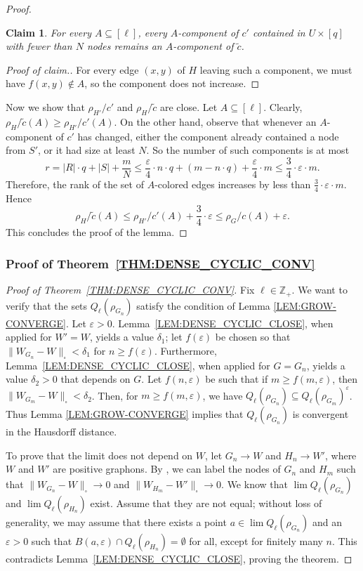 \documentclass[10pt]{article}
\theoremstyle{plain}
\newtheorem{cl}[thm]{Claim}
\theoremstyle{definition}
\newcommand{\bbZ}{\mathbb{Z}}
\newcommand{\tc}{\tilde{c}}
\newcommand{\eps}{\varepsilon}
\newcommand*{\claimproofname}{Proof of claim.}
\newenvironment{claimproof}[1][\claimproofname]{\begin{proof}[#1]\renewcommand*{\qedsymbol}{\(\bullet\)}}{\end{proof}}
\begin{document}
\begin{proof}
\begin{cl}
    For every $A\subseteq[\ell]$, every $A$-component of $c'$ contained in $U\times[q]$ with fewer than $N$ nodes remains an $A$-component of $\tc$.
\end{cl}
\begin{claimproof}
    For every edge $(x,y)$ of $H$ leaving such a component, we must have $f(x,y)\notin A$, so the component does not increase. 
\end{claimproof}    
 
Now we show that $\rho_{H'}/{c'}$ and $\rho_H/\tc$ are close. Let $A\subseteq[\ell]$.
Clearly, $\rho_{H}/\tc(A)\ge \rho_{H'}/{c'}(A)$. On the other hand, observe that whenever an $A$-component of $c'$ has changed, either the component already contained a node from $S'$, or it had size at least $N$. So the number of such components is at most 
\[
r=|R|\cdot q+|S|+\frac{m}{N}\le \frac{\varepsilon}{4}\cdot  n\cdot q + (m-n\cdot q) + \frac{\varepsilon}{4}\cdot  m \le \frac34\cdot \varepsilon\cdot  m.
\]
Therefore, the rank of the set of $A$-colored edges increases by less than $\frac34\cdot \varepsilon\cdot  m$. Hence 
\[
\rho_H/\tc(A)\le \rho_{H'}/{c'}(A) +\frac34\cdot  \varepsilon\le \rho_G/c(A)+\eps.
\]
This concludes the proof of the lemma.
\end{proof}

\subsubsection{Proof of Theorem~\ref{THM:DENSE_CYCLIC_CONV}}

\begin{proof}[Proof of Theorem~\ref{THM:DENSE_CYCLIC_CONV}]
Fix $\ell\in\bbZ_+$. We want to verify that the sets $Q_\ell(\rho_{G_n})$ satisfy the condition of Lemma \ref{LEM:GROW-CONVERGE}. Let $\eps>0$. Lemma~\ref{LEM:DENSE_CYCLIC_CLOSE}, when applied for $W'=W$, yields a value $\delta_1$; let $f(\eps)$ be chosen so that $\|W_{G_n}-W\|_\square<\delta_1$ for $n\ge f(\eps)$. Furthermore, Lemma~\ref{LEM:DENSE_CYCLIC_CLOSE}, when applied for $G=G_n$, yields a value $\delta_2>0$ that depends on $G$. Let $f(n,\eps)$ be such that if $m\ge f(m,\eps)$, then $\|W_{G_m}-W\|_\square<\delta_2$. Then, for $m\ge f(m,\eps)$, we have
$Q_\ell(\rho_{G_n})\subseteq Q_\ell(\rho_{G_m})^\eps$. Thus Lemma \ref{LEM:GROW-CONVERGE} implies that $Q_\ell(\rho_{G_n})$ is convergent in the Hausdorff distance.

To prove that the limit does not depend on $W$, let $G_n\to W$ and $H_n\to W'$, where $W$ and $W'$ are positive graphons. By \cite[Theorem 11.59]{lovasz2012large}, we can label the nodes of $G_n$ and $H_m$ such that $\|W_{G_n}-W\|_{\square}\to0$ and $\|W_{H_m}-W'\|_{\square}\to0$.
We know that $\lim Q_\ell(\rho_{G_n})$ and $\lim Q_\ell(\rho_{H_n})$ exist. Assume that they are not equal; without loss of generality, we may assume that there exists a point $a\in\lim Q_\ell(\rho_{G_n})$ and an $\varepsilon>0$ such that $B(a,\varepsilon)\cap Q_\ell(\rho_{H_n})=\emptyset$ for all, except for finitely many $n$. This contradicts Lemma~\ref{LEM:DENSE_CYCLIC_CLOSE}, proving the theorem.
\end{proof}
\end{document}

